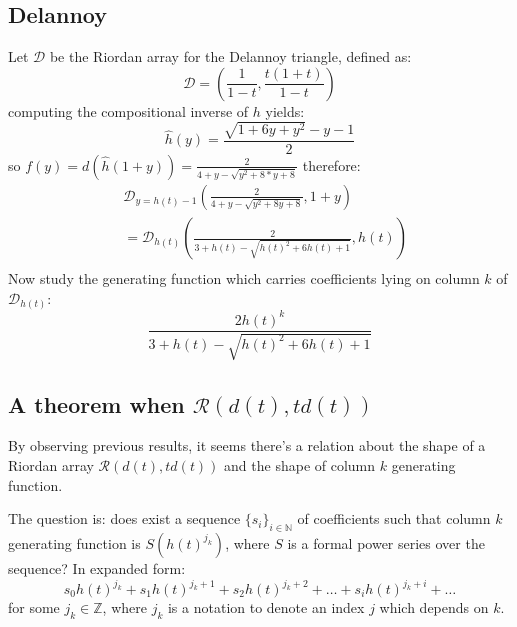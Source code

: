 \documentclass[11pt,a4paper]{article} %
\begin{document}
    \subsection{Delannoy}

    Let $\mathcal{D}$ be the Riordan array for the Delannoy triangle, defined as:
    \begin{displaymath} 
        \mathcal{D} =\left( \frac{1}{1-t}, \frac{t(1+t)}{1-t}  \right)
    \end{displaymath} 
    computing the compositional inverse of $h$ yields:
    \begin{displaymath} 
        \hat{h}(y) = \frac{\sqrt{1+6y+y^2}-y-1}{2}
    \end{displaymath} 
    so $f(y)=d(\hat{h}(1+y))=\frac{2}{4 + y - \sqrt{y^2 + 8*y + 8} }$ therefore:
    \begin{displaymath} 
        \begin{split}
            & \mathcal{D}_{y=h(t)-1}\left( \frac{2}{4+y-\sqrt{y^2+8y+8}}, 1+y \right)\\
            &= \mathcal{D}_{h(t)}\left( \frac{2}{3+h(t)-\sqrt{h(t)^2+6h(t)+1}}, h(t) \right) \\
        \end{split}
    \end{displaymath} 
    Now study the generating function which carries coefficients lying on column $k$
    of $\mathcal{D}_{h(t)}$:
    \begin{displaymath} 
        \frac{2h(t)^k}{3+h(t)-\sqrt{h(t)^2+6h(t)+1}}
    \end{displaymath} 


    \subsection{A theorem when $\mathcal{R}(d(t), td(t))$}

    By observing previous results, it seems there's a relation
    about the shape of a Riordan array $\mathcal{R}(d(t), td(t))$ 
    and the shape of column $k$ generating function. 
    
    The question is: does exist a sequence $\lbrace s_i \rbrace_{i \in \mathbb{N}}$ 
    of coefficients such that column $k$ generating function is $S(h(t)^{j_k})$, where $S$
    is a formal power series over the sequence? In expanded form: 
    \begin{displaymath}
        s_0h(t)^{j_k} + s_1 h(t)^{j_k+1} + s_2 h(t)^{j_k+2} + \ldots + s_i h(t)^{j_k+i} + \ldots
    \end{displaymath}
    for some $j_k \in \mathbb{Z}$, where $j_k$ is a notation to denote an index $j$ 
    which depends on $k$.
\end{document}
